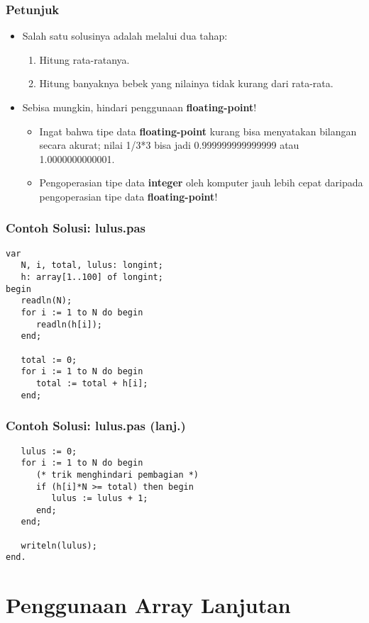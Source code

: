 \documentclass{beamer}
\begin{document}
\begin{frame}
\frametitle{Petunjuk}
\begin{itemize}
    \item Salah satu solusinya adalah melalui dua tahap:
    \begin{enumerate}
        \item Hitung rata-ratanya.
        \item Hitung banyaknya bebek yang nilainya tidak kurang dari rata-rata.
    \end{enumerate}
    \item Sebisa mungkin, hindari penggunaan \textbf{\alert{floating-point}}!
    \begin{itemize}
        \item Ingat bahwa tipe data \textbf{floating-point} kurang bisa menyatakan bilangan secara akurat; nilai 1/3*3 bisa jadi 0.999999999999999 atau 1.0000000000001.
        \item Pengoperasian tipe data \textbf{integer} oleh komputer jauh lebih cepat daripada pengoperasian tipe data \textbf{floating-point}!
    \end{itemize}
\end{itemize}
\end{frame}

\begin{frame}[fragile]
\frametitle{Contoh Solusi: lulus.pas}
\begin{lstlisting}
var
   N, i, total, lulus: longint;
   h: array[1..100] of longint;
begin
   readln(N);
   for i := 1 to N do begin
      readln(h[i]);
   end;

   total := 0;
   for i := 1 to N do begin
      total := total + h[i];
   end;
\end{lstlisting}
\end{frame}

\begin{frame}[fragile]
\frametitle{Contoh Solusi: lulus.pas (lanj.)}
\begin{lstlisting}
   lulus := 0;
   for i := 1 to N do begin
      (* trik menghindari pembagian *)
      if (h[i]*N >= total) then begin
         lulus := lulus + 1;
      end;
   end;

   writeln(lulus);
end.
\end{lstlisting}
\end{frame}

\section{Penggunaan Array Lanjutan}
\frame{\sectionpage}
\end{document}
